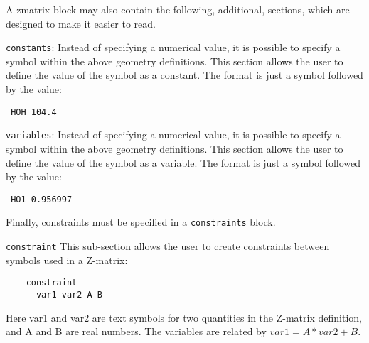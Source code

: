 \documentclass[11pt]{article}
\begin{document}
\begin{description}
A zmatrix block may also contain the following, additional, sections, which
are designed to make it easier to read.

\item \texttt{constants}: Instead of specifying a numerical value, it
  is possible to specify a symbol within the above geometry
  definitions. This section allows the user to define the value of the
  symbol as a constant. The format is just a symbol followed by the
  value:

\noindent\texttt{      HOH 104.4}

\item \texttt{variables}: Instead of specifying a numerical value, it
  is possible to specify a symbol within the above geometry
  definitions. This section allows the user to define the value of the
  symbol as a variable. The format is just a symbol followed by the
  value:

\noindent\texttt{      HO1 0.956997}

Finally, constraints must be specified in a \texttt{constraints} block.

\item \texttt{constraint} This sub-section allows the user to create
  constraints between symbols used in a Z-matrix:
\begin{verbatim}
    constraint
      var1 var2 A B
\end{verbatim}
Here var1 and var2 are text symbols for two quantities in the Z-matrix
definition, and A and B are real numbers. The variables are related by
$var1 = A*var2 + B$.


\end{description}
\end{document}
